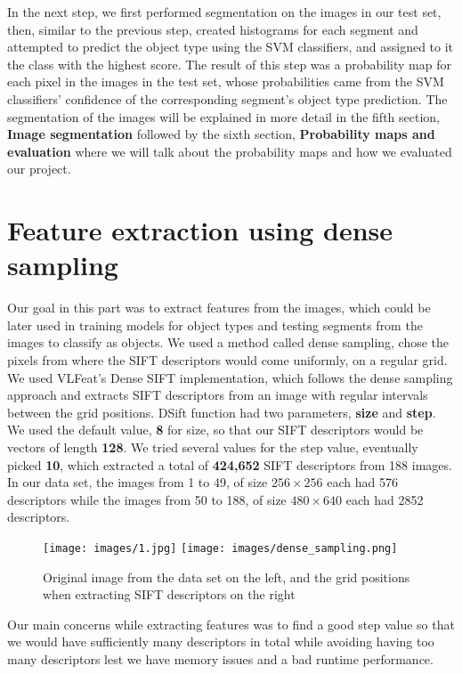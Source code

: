 \documentclass[conference]{IEEEtran}
\newcommand{\secondsection}{Feature extraction using dense sampling}
\newcommand{\fifthsection}{Image segmentation}
\newcommand{\sixthsection}{Probability maps and evaluation}
\begin{document}
In the next step, we first performed segmentation on the images in our test set, then, similar to the previous step, created histograms for each segment and attempted to predict the object type using the SVM classifiers, and assigned to it the class with the highest score. The result of this step was a probability map for each pixel in the images in the test set, whose probabilities came from the SVM classifiers' confidence of the corresponding segment's object type prediction. The segmentation of the images will be explained in more detail in the fifth section, \textbf{\fifthsection} followed by the sixth section, \textbf{\sixthsection} where we will talk about the probability maps and how we evaluated our project.

\section{\secondsection}

Our goal in this part was to extract features from the images, which could be later used in training models for object types and testing segments from the images to classify as objects. We used a method called dense sampling, chose the pixels from where the SIFT descriptors would come uniformly, on a regular grid. We used VLFeat's Dense SIFT implementation\cite{vlfeat-dsift}, which follows the dense sampling approach and extracts SIFT descriptors from an image with regular intervals between the grid positions. DSift function had two parameters, \textbf{size} and \textbf{step}. We used the default value, \textbf{8} for size, so that our SIFT descriptors would be vectors of length \textbf{128}. We tried several values for the step value, eventually picked \textbf{10}, which extracted a total of \textbf{424,652} SIFT descriptors from 188 images. In our data set, the images from 1 to 49, of size $256 \times 256$ each had 576 descriptors while the images from 50 to 188, of size $480 \times 640$ each had 2852 descriptors. 

\begin{figure}[!h]
    \centering
    \texttt{[image: images/1.jpg]}
    \texttt{[image: images/dense\_sampling.png]}
    \caption{Original image from the data set on the left, and the grid positions when extracting SIFT descriptors on the right}
    \label{fig:my_label}
\end{figure}

Our main concerns while extracting features was to find a good step value so that we would have sufficiently many descriptors in total while avoiding having too many descriptors lest we have memory issues and a bad runtime performance.
\end{document}
